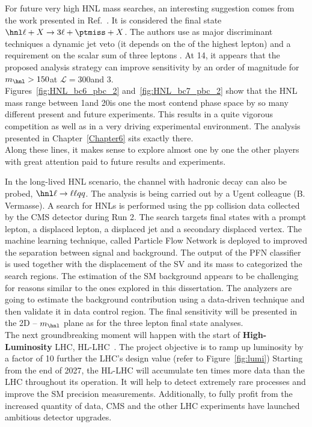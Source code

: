 For future very high HNL mass searches, an interesting suggestion comes from
the work presented in Ref.~\cite{Pascoli_2019}. It is considered the
final state $\hnl \ell + X\rightarrow 3\ell + \ptmiss + X$. The
authors use as major
discriminant techniques a dynamic
jet veto (\ie it depends on the \pt of the highest \pt lepton) and a
requirement on the scalar sum of three leptons \pt. At 14\TeV, it appears that
the proposed analysis strategy can
improve sensitivity by an order of
magnitude for $m_\hnl > 150$\GeV at $\mathcal{L} = 300$\fbinv and
3\abinv. \\

Figures~\ref{fig:HNL_bc6_pbc_2} and~\ref{fig:HNL_bc7_pbc_2} show that
the HNL mass range between 1\GeV and 20\GeV is one the most contend phase
space by so many different present and future experiments. This
results in a quite vigorous competition as well as in a very driving
experimental environment. The analysis presented in Chapter~\ref{Chapter6} sits exactly there. \\
Along these lines, it makes sense to explore almost one by one the
other players with great attention paid to future results and experiments.

In the long-lived HNL scenario, the channel with hadronic \PW decay
can also be probed, \ie $\hnl \ell \rightarrow \ell \ell q q $. The analysis is being carried out by a Ugent
colleague (B. Vermasse). A search for HNLs is performed using the pp collision
data collected by the CMS detector during Run
2. The search targets final states with a prompt lepton, a displaced lepton, a
displaced jet and a secondary displaced vertex. The machine
learning technique, called Particle Flow Network is deployed to
improved the separation between signal and background.
The output of the PFN classifier is used together with the
displacement of the SV and its mass to categorized the search regions.
The estimation of the SM background appears to be challenging for
reasons similar to the ones explored in this dissertation. The
analyzers are going to estimate the background contribution using a data-driven 
technique and then validate it in data control region. The
final sensitivity will be presented in the 2D \mixpar -- $m_\hnl$
plane as for the three lepton final state analyses.\\

The next groundbreaking moment will happen with the start of
\textbf{High-Luminosity} LHC,
HL-LHC~\cite{ZurbanoFernandez:2020cco}. The project objective is to
ramp up luminosity by a factor of 10 further the LHC’s design value
(refer to Figure~\ref{fig:lumi})
Starting from the end of 2027, the HL-LHC will accumulate ten times
more data than the LHC throughout its operation. It will help to
detect extremely rare processes and improve the SM precision
measurements. Additionally, to fully profit from the increased quantity of data, CMS and the other
LHC experiments have launched ambitious detector upgrades.


